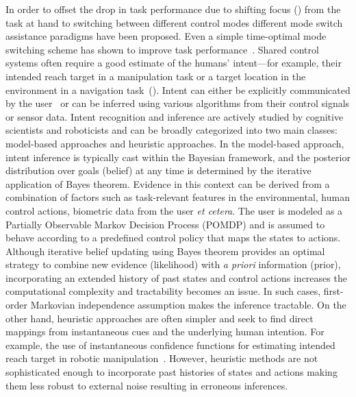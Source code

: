 In order to offset the drop in task performance due to shifting focus () from the task at hand to switching between different control modes different mode switch assistance paradigms have been proposed. Even a simple time-optimal mode switching scheme has shown to improve task performance~\cite{herlant2016assistive}. 
Shared control systems often require a good estimate of the humans' intent---for example, their intended reach target in a manipulation task or a target location in the environment in a navigation task~(\cite{liu2016goal}). Intent can either be explicitly communicated by the user~\cite{choi2008laser} or can be inferred using various algorithms from their control signals or sensor data. Intent recognition and inference are actively studied by cognitive scientists and roboticists and can be broadly categorized into two main classes: model-based approaches and heuristic approaches. In the model-based approach, intent inference is typically cast within the Bayesian framework, and the posterior distribution over goals (belief) at any time is determined by the iterative application of Bayes theorem. Evidence in this context can be derived from a combination of factors such as task-relevant features in the environmental, human control actions, biometric data from the user \textit{et cetera}. The user is modeled as a Partially Observable Markov Decision Process (POMDP) and is assumed to behave according to a predefined control policy that maps the states to actions. Although iterative belief updating using Bayes theorem provides an optimal strategy to combine new evidence (likelihood) with \textit{a priori} information (prior), incorporating an extended history of past states and control actions increases the computational complexity and tractability becomes an issue. In such cases,  first-order Markovian independence assumption makes the inference tractable. On the other hand, heuristic approaches are often simpler and seek to find direct mappings from instantaneous cues and the underlying human intention. For example, the use of instantaneous confidence functions for estimating intended reach target in robotic manipulation~\cite{dragan2012assistive, gopinath2017human}.  However, heuristic methods are not sophisticated enough to incorporate past histories of states and actions making them less robust to external noise resulting in erroneous inferences. 

